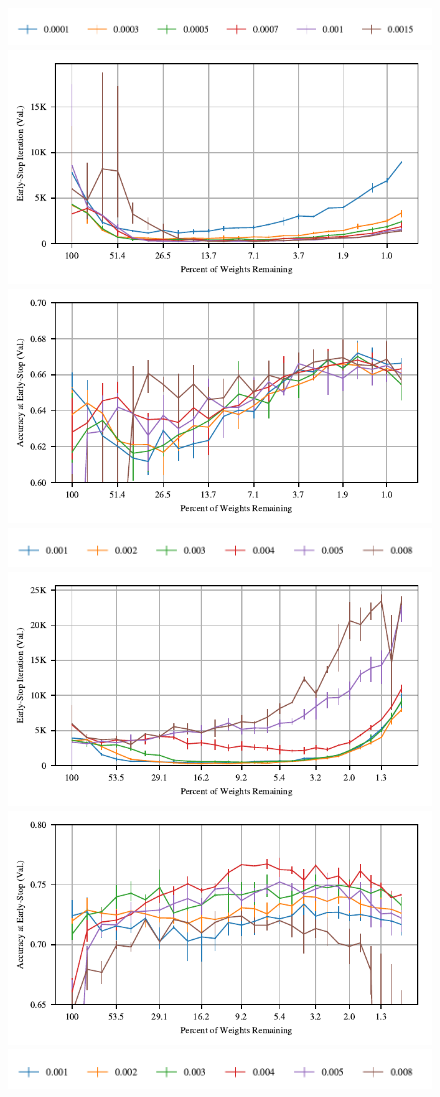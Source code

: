 \begin{figure}
\centering
\includegraphics[width=.7\textwidth]{graphs/cifar10/conv/momentum_rate_sweep1/legend}
\includegraphics[width=.5\textwidth]{graphs/cifar10/conv/momentum_rate_sweep1/iteration}%
\includegraphics[width=.5\textwidth]{graphs/cifar10/conv/momentum_rate_sweep1/accuracy}
\includegraphics[width=.7\textwidth]{graphs/cifar10/conv/momentum_rate_sweep2/legend}
\includegraphics[width=.5\textwidth]{graphs/cifar10/conv/momentum_rate_sweep2/iteration}%
\includegraphics[width=.5\textwidth]{graphs/cifar10/conv/momentum_rate_sweep2/accuracy}
\includegraphics[width=.7\textwidth]{graphs/cifar10/conv/momentum_rate_sweep3/legend}

\end{figure}

